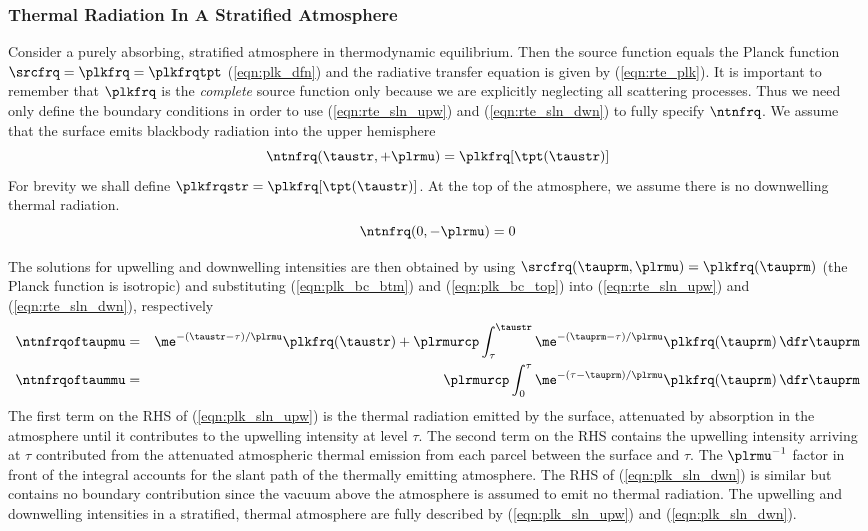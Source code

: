 \documentclass[12pt]{article}
\begin{document}
\subsubsection[Thermal Radiation In A Stratified Atmosphere]{Thermal
Radiation In A Stratified Atmosphere}\label{sxn:rte_plk_sln}
Consider a purely absorbing, stratified atmosphere in thermodynamic 
equilibrium.
Then the source function equals the Planck function $\srcfrq =
\plkfrq = \plkfrqtpt$ (\ref{eqn:plk_dfn}) and the radiative transfer
equation is given by (\ref{eqn:rte_plk}). 
It is important to remember that $\plkfrq$ is the \textit{complete}
source function only because we are explicitly neglecting all
scattering processes. 
Thus we need only define the boundary conditions in order to use
(\ref{eqn:rte_sln_upw}) and (\ref{eqn:rte_sln_dwn}) to fully
specify $\ntnfrq$. 
We assume that the surface emits blackbody radiation into the upper
hemisphere 
\begin{equation}
\ntnfrq(\taustr,+\plrmu) = \plkfrq[\tpt(\taustr)]
\label{eqn:plk_bc_btm}
\end{equation}
For brevity we shall define $\plkfrqstr = \plkfrq[\tpt(\taustr)]$.
At the top of the atmosphere, we assume there is no downwelling
thermal radiation.
\begin{equation}
\ntnfrq(0,-\plrmu) = 0
\label{eqn:plk_bc_top}
\end{equation}

The solutions for upwelling and downwelling intensities are then
obtained by using $\srcfrq(\tauprm,\plrmu) = \plkfrq(\tauprm)$ (the
Planck function is isotropic) and substituting (\ref{eqn:plk_bc_btm})
and (\ref{eqn:plk_bc_top}) into (\ref{eqn:rte_sln_upw}) and
(\ref{eqn:rte_sln_dwn}), respectively
\begin{eqnarray}
\label{eqn:plk_sln_upw}
\ntnfrqoftaupmu & = & 
\me^{-(\taustr - \tau)/\plrmu} \plkfrq(\taustr) + 
\plrmurcp \int_{\tau}^{\taustr} 
\me^{-(\tauprm - \tau)/\plrmu} \plkfrq(\tauprm) \,\dfr\tauprm \\
\label{eqn:plk_sln_dwn}
\ntnfrqoftaummu & = & 
\plrmurcp \int_{0}^{\tau} 
\me^{-(\tau - \tauprm)/\plrmu} \plkfrq(\tauprm) \,\dfr\tauprm
\end{eqnarray}
The first term on the RHS of (\ref{eqn:plk_sln_upw}) is the thermal
radiation emitted by the surface, attenuated by absorption in the
atmosphere until it contributes to the upwelling intensity at level
$\tau$.  
The second term on the RHS contains the upwelling intensity arriving
at $\tau$ contributed from the attenuated atmospheric thermal emission
from each parcel between the surface and $\tau$. 
The $\plrmu^{-1}$ factor in front of the integral accounts for the
slant path of the thermally emitting atmosphere.
The RHS of (\ref{eqn:plk_sln_dwn}) is similar but contains no boundary
contribution since the vacuum above the atmosphere is assumed to emit
no thermal radiation.
The upwelling and downwelling intensities in a stratified, thermal
atmosphere are fully described by (\ref{eqn:plk_sln_upw}) and
(\ref{eqn:plk_sln_dwn}).
\end{document}
